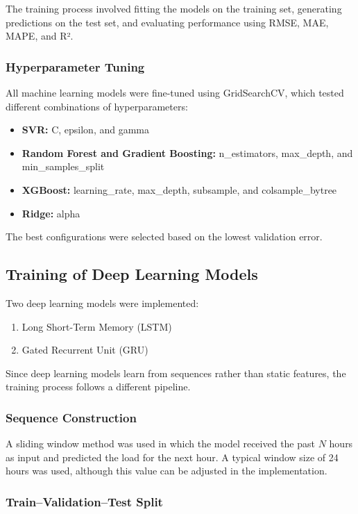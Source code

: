 \documentclass[oneside, 12pt]{book}
\numberwithin{equation}{chapter}
\newcommand{\sizexii}{\fontsize{12pt}{6pt}\selectfont}
\begin{document}
The training process involved fitting the models on the training set, generating predictions on the test set, and evaluating performance using RMSE, MAE, MAPE, and R².

\subsubsection{Hyperparameter Tuning}

All machine learning models were fine-tuned using GridSearchCV, which tested different combinations of hyperparameters:
\begin{itemize}
    \item \textbf{SVR:} C, epsilon, and gamma
    \item \textbf{Random Forest and Gradient Boosting:} n\_estimators, max\_depth, and min\_samples\_split
    \item \textbf{XGBoost:} learning\_rate, max\_depth, subsample, and colsample\_bytree
    \item \textbf{Ridge:} alpha
\end{itemize}

The best configurations were selected based on the lowest validation error.

\subsection{\sizexii Training of Deep Learning Models}

Two deep learning models were implemented:
\begin{enumerate}
    \item Long Short-Term Memory (LSTM)
    \item Gated Recurrent Unit (GRU)
\end{enumerate}

Since deep learning models learn from sequences rather than static features, the training process follows a different pipeline.

\subsubsection{Sequence Construction}

A sliding window method was used in which the model received the past $N$ hours as input and predicted the load for the next hour. A typical window size of 24 hours was used, although this value can be adjusted in the implementation.

\subsubsection{Train--Validation--Test Split}
\end{document}
